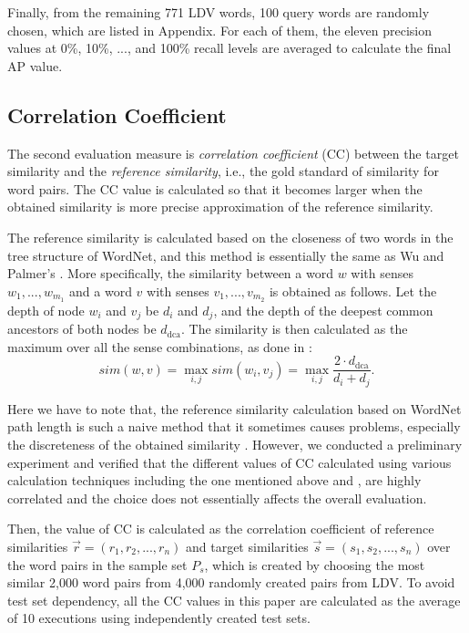 \documentclass[english]{jnlp_1.4}
\begin{document}
Finally, from the remaining 771 LDV words, 100 query words are
randomly chosen, which are listed in Appendix. For each of them, the
eleven precision values at 0\%, 10\%, ..., and 100\% recall levels are
averaged to calculate the final AP value.

\subsection{Correlation Coefficient}

The second evaluation measure is {\em correlation coefficient} (CC)
between the target similarity and the {\em reference similarity},
i.e., the gold standard of similarity for word pairs. The CC value is
calculated so that it becomes larger when the obtained similarity is
more precise approximation of the reference similarity.

The reference similarity is calculated based on the closeness of two
words in the tree structure of WordNet, and this method is essentially
the same as Wu and Palmer's \cite{Wu:94}. More specifically, the
similarity between a word $w$ with senses $w_1, ..., w_{m_1}$ and a word
$v$ with senses $v_1, ..., v_{m_2}$ is obtained as follows. Let the
depth of node $w_i$ and $v_j$ be $d_i$ and $d_j$, and the depth of the
deepest common ancestors of both nodes be $d_{\mathrm{dca}}$. The
similarity is then calculated as the maximum over all the sense
combinations, as done in \cite{Lin:98}:
\[
  sim(w, v) = \max_{i, j} sim(w_i, v_j) = \max_{i, j} \frac{2\cdot d_{\mathrm{dca}}}{d_i
  + d_j}.
\]

Here we have to note that, the reference similarity calculation based
on WordNet path length is such a naive method that it sometimes causes
problems, especially the discreteness of the obtained similarity
\cite{Budanitsky:06}. However, we conducted a preliminary experiment
and verified that the different values of CC calculated using various
calculation techniques including the one mentioned above and
\cite{Jiang:97,Hirst:98}, are highly correlated and the choice does
not essentially affects the overall evaluation.

Then, the value of CC is calculated as the correlation coefficient of
reference similarities $\vec r = (r_1, r_2, ..., r_n)$ and target
similarities $\vec s = (s_1, s_2, ..., s_n)$ over the word pairs in
the sample set $P_s$, which is created by choosing the most similar 2,000
word pairs from 4,000 randomly created pairs from LDV. To avoid test
set dependency, all the CC values in this paper are calculated as the
average of 10 executions using independently created test sets.
\end{document}
